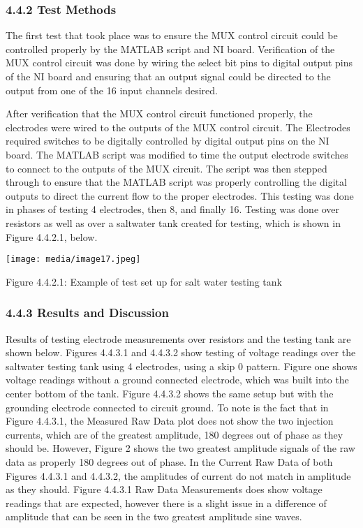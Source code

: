 \subsubsection*{\texorpdfstring{\textbf{4.4.2 Test Methods}
}{4.4.2 Test Methods }}\label{test-methods-2}

The first test that took place was to ensure the MUX control circuit
could be controlled properly by the MATLAB script and NI board.
Verification of the MUX control circuit was done by wiring the select
bit pins to digital output pins of the NI board and ensuring that an
output signal could be directed to the output from one of the 16 input
channels desired.

After verification that the MUX control circuit functioned properly, the
electrodes were wired to the outputs of the MUX control circuit. The
Electrodes required switches to be digitally controlled by digital
output pins on the NI board. The MATLAB script was modified to time the
output electrode switches to connect to the outputs of the MUX circuit.
The script was then stepped through to ensure that the MATLAB script was
properly controlling the digital outputs to direct the current flow to
the proper electrodes. This testing was done in phases of testing 4
electrodes, then 8, and finally 16. Testing was done over resistors as
well as over a saltwater tank created for testing, which is shown in
Figure 4.4.2.1, below.

\texttt{[image: media/image17.jpeg]}

Figure 4.4.2.1: Example of test set up for salt water testing tank

\subsubsection*{\texorpdfstring{\textbf{4.4.3 Results and
Discussion}~}{4.4.3 Results and Discussion~}}\label{results-and-discussion-2}

Results of testing electrode measurements over resistors and the testing
tank are shown below. Figures 4.4.3.1 and 4.4.3.2 show testing of
voltage readings over the saltwater testing tank using 4 electrodes,
using a skip 0 pattern. Figure one shows voltage readings without a
ground connected electrode, which was built into the center bottom of
the tank. Figure 4.4.3.2 shows the same setup but with the grounding
electrode connected to circuit ground. To note is the fact that in
Figure 4.4.3.1, the Measured Raw Data plot does not show the two
injection currents, which are of the greatest amplitude, 180 degrees out
of phase as they should be. However, Figure 2 shows the two greatest
amplitude signals of the raw data as properly 180 degrees out of phase.
In the Current Raw Data of both Figures 4.4.3.1 and 4.4.3.2, the
amplitudes of current do not match in amplitude as they should. Figure
4.4.3.1 Raw Data Measurements does show voltage readings that are
expected, however there is a slight issue in a difference of amplitude
that can be seen in the two greatest amplitude sine waves.

